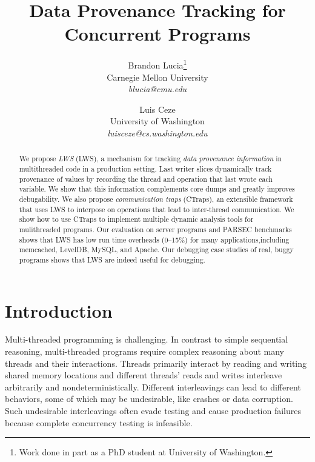 \documentclass[pageno,nohyperref]{jpaper}
\author{Brandon Lucia\thanks{Work done in part as a PhD student at University of Washington.}\\Carnegie Mellon University\\{\em blucia@cmu.edu} \and Luis Ceze\\University of Washington\\{\em luisceze@cs.washington.edu}}
\title{Data Provenance Tracking for Concurrent Programs}
\date{}
\newcommand{\ctraps}{CTraps\xspace}
\newcommand{\lws}{LWS\xspace}
\begin{document}
\setlength{\pdfpageheight}{\paperheight}
\setlength{\pdfpagewidth}{\paperwidth}

\maketitle

\thispagestyle{empty}
\begin{abstract}
We propose {\em \lws} (\lws), a mechanism for tracking {\em data
provenance information} in multithreaded code in a production setting.  Last
writer slices dynamically track provenance of values by recording the thread
and operation that last wrote each variable. We show that this information
complements core dumps and greatly improves debugability. We also propose {\em
communication traps} (\ctraps), an extensible framework that uses \lws to interpose on operations that lead to inter-thread communication. We
show how to use \ctraps to implement multiple dynamic analysis tools for
mulithreaded programs. Our evaluation on server programs and PARSEC benchmarks
shows that \lws has low run time overheads (0--15\%) for many
applications,including  memcached, LevelDB, MySQL, and Apache. Our debugging
case studies of real, buggy programs shows that \lws are indeed
useful for debugging.  
\end{abstract}

\section{Introduction}
Multi-threaded programming is challenging.  In contrast to simple sequential
reasoning, multi-threaded programs require complex reasoning about many threads
and their interactions.  Threads primarily interact by reading and writing
shared memory locations and different threads' reads and writes interleave
arbitrarily and nondeterministically. Different interleavings can lead to
different behaviors, some of which may be undesirable, like crashes or data
corruption. Such undesirable interleavings often evade testing and cause
production failures because complete concurrency testing is infeasible.
\end{document}
